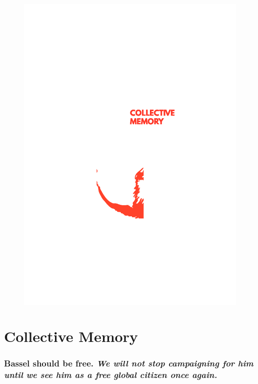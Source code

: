 \begin{figure}[htbp]
\centering
\includegraphics{../../images/cost-of-freedom-collective-memory.jpg}
\caption{}
\end{figure}

\section{Collective Memory}\label{collective-memory}

\subsubsection{\texorpdfstring{Bassel should be free. \emph{We will not
stop campaigning for him until we see him as a free global citizen once
again.}}{Bassel should be free. We will not stop campaigning for him until we see him as a free global citizen once again.}}\label{bassel-should-be-free.-we-will-not-stop-campaigning-for-him-until-we-see-him-as-a-free-global-citizen-once-again.}

